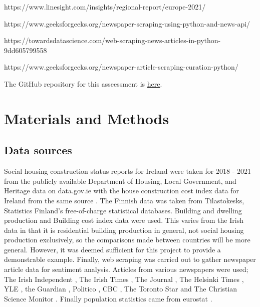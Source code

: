 \documentclass[hidelinks,12pt,oneside]{report} %
\begin{document}
https://www.linesight.com/insights/regional-report/europe-2021/

https://www.geeksforgeeks.org/newspaper-scraping-using-python-and-news-api/

https://towardsdatascience.com/web-scraping-news-articles-in-python-9dd605799558

https://www.geeksforgeeks.org/newspaper-article-scraping-curation-python/

The GitHub repository for this asseessment is
\href{https://github.com/coharaCNJ/CCT_MSc_ContinuousAssessment2.git}{here}.

\chapter{Materials and Methods}
\section{Data sources}
Social housing construction status reports for Ireland were taken for 2018 - 2021 from the publicly available Department of Housing, Local Government, and Heritage data on data.gov.ie \citep{Social} with the house construction cost index data for Ireland from the same source \citep{construction}. The Finnish data was taken from Tilastokesks, Statistics Finland’s free-of-charge statistical databases. Building and dwelling production \citep{12fy} and Building cost index \citep{11na} data were used. This varies from the Irish data in that it is residential building production in general, not social housing production exclusively, so the comparisons made between countries will be more general. However, it was deemed sufficient for this project to provide a demonstrable example. Finally, web scraping was carried out to gather newspaper article data for sentiment analysis. Articles from various newspapers were used; The Irish Independent \citep{TII}, The Irish Times \citep{TIT}, The Journal \citep{TJ}, The Helsinki Times \citep{THT}, YLE \citep{YLE}, the Guardian \citep{TG, TG2}, Politico \citep{P}, CBC \citep{CBC, CBC2}, The Toronto Star \citep{TS} and The Christian Science Monitor \citep{CS}. Finally population statistics came from eurostat \citep{eurostat}.
\end{document}
